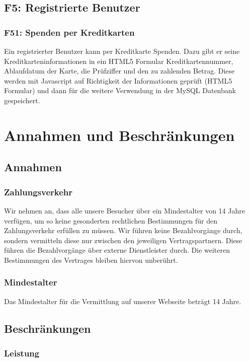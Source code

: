 \documentclass[10pt,a4paper]{scrartcl}
\begin{document}
\subsection{F5: Registrierte Benutzer}

\subsubsection*{F51: Spenden per Kreditkarten}

Ein registrierter Benutzer kann per Kreditkarte Spenden. Dazu gibt er seine Kreditkarteninformationen in ein HTML5 Formular Kreditkartennummer, Ablaufdatum der Karte, die Prüfziffer und den zu zahlenden Betrag. Diese werden mit Javascript auf Richtigkeit der Informationen geprüft (HTML5 Formular) und dann für die weitere Verwendung in der MySQL Datenbank gespeichert.

\section{Annahmen und Beschränkungen}
\subsection{Annahmen}

\subsubsection*{Zahlungsverkehr}
Wir nehmen an, dass alle unsere Besucher über ein Mindestalter von 14 Jahre verfügen, um so keine gesonderten rechtlichen Bestimmungen für den Zahlungsverkehr erfüllen zu müssen.
Wir führen keine Bezahlvorgänge durch, sondern vermitteln diese nur zwischen den jeweiligen Vertragspartnern. Diese führen die Bezahlvorgänge über externe Dienstleister durch.
Die weiteren Bestimmungen des Vertrages bleiben hiervon unberührt.

\subsubsection*{Mindestalter}
Das Mindestalter für die Vermittlung auf unserer Webseite beträgt 14 Jahre.


\subsection{Beschränkungen}

\subsubsection*{Leistung}
\end{document}
